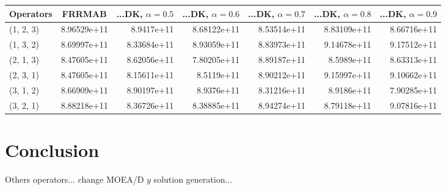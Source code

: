 \documentclass{article}
\newcommand\tab[1][0.6cm]{\hspace*{#1}}
\begin{document}
\begin{center}
    \begin{tabular}{|l|c|r|r|r|r|r|}
      \hline
      Operators & FRRMAB & ...DK, $\alpha = 0.5$ & ...DK, $\alpha = 0.6$ & ...DK, $\alpha = 0.7$ & ...DK, $\alpha = 0.8$ & ...DK, $\alpha = 0.9$\\
      \hline
      (1, 2, 3) & 8.96529e+11 
                & \cellcolor{green!20}8.9417e+11 
                & \cellcolor{green!50}8.68122e+11 
                & \cellcolor{green!100}8.53514e+11 
                & \cellcolor{green!20}8.83109e+11 
                & \cellcolor{green!50}8.66716e+11\\
                
      (1, 3, 2) & 8.69997e+11 
                & \cellcolor{green!70}8.33684e+11 
                & \cellcolor{red!40}8.93059e+11 
                & \cellcolor{red!20}8.83973e+11 
                & \cellcolor{red!50}9.14678e+11 
                & \cellcolor{red!50}9.17512e+11\\
                
      (2, 1, 3) & 8.47605e+11 
                & \cellcolor{red!20}8.62056e+11 
                & \cellcolor{green!80}7.80205e+11 
                & \cellcolor{red!40}8.89187e+11 
                & \cellcolor{red!30}8.5989e+11 
                & \cellcolor{red!35}8.63313e+11\\
                
      (2, 3, 1) & 8.47605e+11 
                & \cellcolor{green!30}8.15611e+11 
                & \cellcolor{red!10}8.5119e+11 
                & \cellcolor{red!50}8.90212e+11 
                & \cellcolor{red!70}9.15997e+11 
                & \cellcolor{red!70}9.10662e+11\\
                
      (3, 1, 2) & 8.66909e+11 
                & \cellcolor{red!20}8.90197e+11 
                & \cellcolor{red!20}8.9376e+11 
                & \cellcolor{green!50}8.31216e+11 
                & \cellcolor{red!20}8.9186e+11 
                & \cellcolor{green!80}7.90285e+11\\
                
      (3, 2, 1) & 8.88218e+11 
                & \cellcolor{green!50}8.36726e+11 
                & \cellcolor{green!50}8.38885e+11 
                & \cellcolor{red!15}8.94274e+11 
                & \cellcolor{green!10}8.79118e+11 
                & \cellcolor{red!25}9.07816e+11\\
      \hline
    \end{tabular}
\end{center}

\newpage
\section{Conclusion}

\tab Others operators... change MOEA/D $y$ solution generation...




\end{document}
